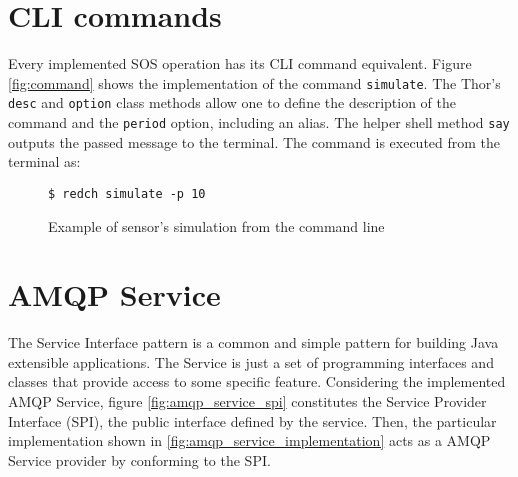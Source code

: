 \section{CLI commands}

Every implemented SOS operation has its CLI command equivalent. Figure \ref{fig:command} shows the implementation of the command \texttt{simulate}. The Thor's \texttt{desc} and \texttt{option} class methods allow one to define the description of the command and the \texttt{period} option, including an alias. The helper shell method \texttt{say} outputs the passed message to the terminal. The command is executed from the terminal as:

\begin{figure}[H]
  \centering
  \texttt{\$ redch simulate -p 10}
  \caption{Example of sensor's simulation from the command line}
\end{figure}


\section{AMQP Service}

The Service Interface pattern is a common and simple pattern for building Java extensible applications. The Service is just a set of programming interfaces and classes that provide access to some specific feature. Considering the implemented AMQP Service, figure \ref{fig:amqp_service_spi} constitutes the Service Provider Interface (SPI), the public interface defined by the service. Then, the particular implementation shown in \ref{fig:amqp_service_implementation} acts as a AMQP Service provider by conforming to the SPI.

